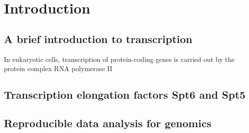 \chapter{Introduction}

\section{A brief introduction to transcription}

In eukaryotic cells, transcription of protein-coding genes is carried out by the protein complex RNA polymerase II

\lipsum[1]

\section{Transcription elongation factors Spt6 and Spt5}

\lipsum[1]

\section{Reproducible data analysis for genomics}

\lipsum[1]

